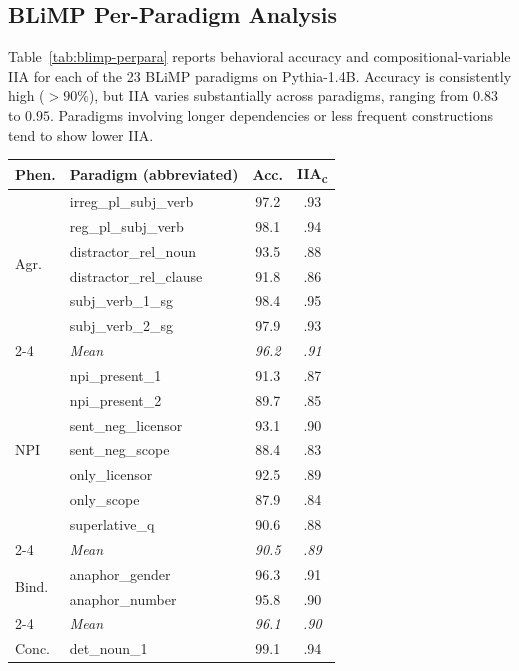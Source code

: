 \documentclass[11pt]{article}
\begin{document}
\subsection{BLiMP Per-Paradigm Analysis}
\label{app:blimp-results}

Table~\ref{tab:blimp-perpara} reports behavioral accuracy and compositional-variable IIA for each of the 23 BLiMP paradigms on Pythia-1.4B.
Accuracy is consistently high ($> 90\%$), but IIA varies substantially across paradigms, ranging from $0.83$ to $0.95$.
Paradigms involving longer dependencies or less frequent constructions tend to show lower IIA.

\begin{table}[t]
\centering\small
\setlength{\tabcolsep}{2.0pt}
\begin{tabular}{@{}llcc@{}}
\toprule
\textbf{Phen.} & \textbf{Paradigm (abbreviated)} & \textbf{Acc.} & \textbf{IIA\textsubscript{c}} \\
\midrule
\multirow{6}{*}{Agr.}
 & irreg\_pl\_subj\_verb & 97.2 & .93 \\
 & reg\_pl\_subj\_verb & 98.1 & .94 \\
 & distractor\_rel\_noun & 93.5 & .88 \\
 & distractor\_rel\_clause & 91.8 & .86 \\
 & subj\_verb\_1\_sg & 98.4 & .95 \\
 & subj\_verb\_2\_sg & 97.9 & .93 \\
\cmidrule{2-4}
 & \textit{Mean} & \textit{96.2} & \textit{.91} \\
\midrule
\multirow{7}{*}{NPI}
 & npi\_present\_1 & 91.3 & .87 \\
 & npi\_present\_2 & 89.7 & .85 \\
 & sent\_neg\_licensor & 93.1 & .90 \\
 & sent\_neg\_scope & 88.4 & .83 \\
 & only\_licensor & 92.5 & .89 \\
 & only\_scope & 87.9 & .84 \\
 & superlative\_q & 90.6 & .88 \\
\cmidrule{2-4}
 & \textit{Mean} & \textit{90.5} & \textit{.89} \\
\midrule
\multirow{2}{*}{Bind.}
 & anaphor\_gender & 96.3 & .91 \\
 & anaphor\_number & 95.8 & .90 \\
\cmidrule{2-4}
 & \textit{Mean} & \textit{96.1} & \textit{.90} \\
\midrule
\multirow{8}{*}{Conc.}
 & det\_noun\_1 & 99.1 & .94 \\

\end{tabular}
\end{table}
\end{document}

